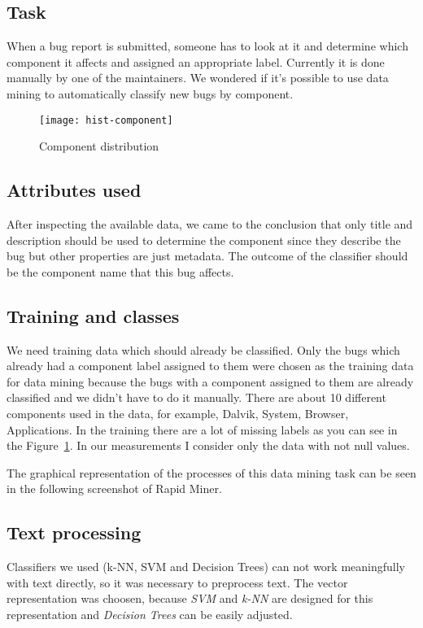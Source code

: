 
\subsection*{Task} %
\label{sub:Task}
When a bug report is submitted, someone has to look at it and determine which component it affects and assigned an appropriate label. Currently it is done manually by one of the maintainers. We wondered if it's possible to use data mining to automatically classify new bugs by component.

\begin{figure}[!htp]
\begin{center} 
\texttt{[image: hist-component]}
\caption{\label{fig:component}Component distribution}
\end{center}
\end{figure}

\subsection*{Attributes used} %
\label{sub:Attributes used}
After inspecting the available data, we came to the conclusion that only title and description should be used to determine the component since they describe the bug but other properties are just metadata. The outcome of the classifier should be the component name that this bug affects.

\subsection*{Training and classes} %
\label{sub:Training and classes}
We need training data which should already be classified. Only the bugs which already had a component label assigned to them were chosen as the training data for data mining because the bugs with a component assigned to them are already classified and we didn't have to do it manually. There are about 10 different components used in the data, for example, Dalvik, System, Browser, Applications.
In the training there are a lot of missing labels as you can see in the  Figure~\ref{fig:component}. In our measurements I consider only the data with not null values.

The graphical representation of the processes of this data mining task can be seen in the following screenshot of Rapid Miner.


\subsection*{Text processing} %
\label{sub:Text processing}
Classifiers we used (k-NN, SVM and Decision Trees) can not work meaningfully with text directly, so it was necessary to preprocess text. The vector representation was choosen, because {\it SVM} and {\it k-NN} are designed for this representation and {\it Decision Trees} can be easily adjusted.

